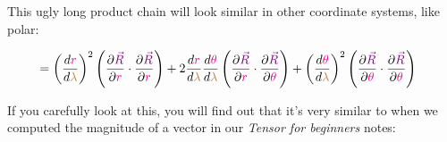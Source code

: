 This ugly long product chain will look similar in other coordinate systems, like polar:

\begin{align*}
    &= \left(\frac{d \begingroup\color{magenta}r\endgroup}{d \begingroup\color{brown}\lambda\endgroup}\right)^2 \left(\frac{\partial \begingroup\color{violet}\vec{R}\endgroup}{\partial \begingroup\color{magenta}r\endgroup} \cdot \frac{\partial \begingroup\color{violet}\vec{R}\endgroup}{\partial \begingroup\color{magenta}r\endgroup}\right) +
    2 \frac{d \begingroup\color{magenta}r\endgroup}{d \begingroup\color{brown}\lambda\endgroup} \frac{d \begingroup\color{magenta}\theta\endgroup}{d \begingroup\color{brown}\lambda\endgroup} \left(\frac{\partial \begingroup\color{violet}\vec{R}\endgroup}{\partial \begingroup\color{magenta}r\endgroup} \cdot \frac{\partial \begingroup\color{violet}\vec{R}\endgroup}{\partial \begingroup\color{magenta}\theta\endgroup}\right) +
    \left(\frac{d \begingroup\color{magenta}\theta\endgroup}{d \begingroup\color{brown}\lambda\endgroup}\right)^2  \left(\frac{\partial \begingroup\color{violet}\vec{R}\endgroup}{\partial \begingroup\color{magenta}\theta\endgroup} \cdot \frac{\partial \begingroup\color{violet}\vec{R}\endgroup}{\partial \begingroup\color{magenta}\theta\endgroup}\right)
\end{align*}

If you carefully look at this, you will find out that it's very similar to when we computed the magnitude of a vector in our
\textit{Tensor for beginners} notes:


